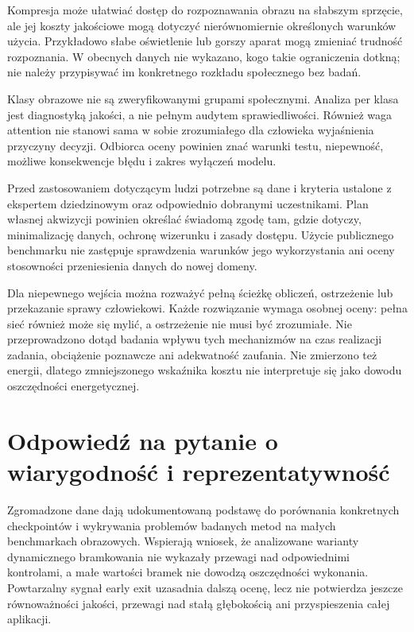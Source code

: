 \documentclass[12pt,a4paper]{article}
\begin{document}
Kompresja może ułatwiać dostęp do rozpoznawania obrazu na słabszym sprzęcie,
ale jej koszty jakościowe mogą dotyczyć nierównomiernie określonych warunków
użycia. Przykładowo słabe oświetlenie lub gorszy aparat mogą zmieniać
trudność rozpoznania. W obecnych danych nie wykazano, kogo takie ograniczenia
dotkną; nie należy przypisywać im konkretnego rozkładu społecznego bez badań.

Klasy obrazowe nie są zweryfikowanymi grupami społecznymi. Analiza per klasa
jest diagnostyką jakości, a nie pełnym audytem sprawiedliwości.
Również waga attention nie stanowi sama w sobie zrozumiałego dla człowieka
wyjaśnienia przyczyny decyzji. Odbiorca oceny powinien znać warunki testu,
niepewność, możliwe konsekwencje błędu i zakres wyłączeń modelu.

Przed zastosowaniem dotyczącym ludzi potrzebne są dane i kryteria ustalone
z ekspertem dziedzinowym oraz odpowiednio dobranymi uczestnikami.
Plan własnej akwizycji powinien określać świadomą zgodę tam, gdzie dotyczy,
minimalizację danych, ochronę wizerunku i zasady dostępu. Użycie publicznego
benchmarku nie zastępuje sprawdzenia warunków jego wykorzystania ani oceny
stosowności przeniesienia danych do nowej domeny.

Dla niepewnego wejścia można rozważyć pełną ścieżkę obliczeń, ostrzeżenie
lub przekazanie sprawy człowiekowi. Każde rozwiązanie wymaga osobnej
oceny: pełna sieć również może się mylić, a ostrzeżenie nie musi być
zrozumiałe. Nie przeprowadzono dotąd badania wpływu tych mechanizmów na
czas realizacji zadania, obciążenie poznawcze ani adekwatność zaufania.
Nie zmierzono też energii, dlatego zmniejszonego wskaźnika kosztu nie
interpretuje się jako dowodu oszczędności energetycznej.

\section{Odpowiedź na pytanie o wiarygodność i reprezentatywność}

Zgromadzone dane dają udokumentowaną podstawę do porównania konkretnych
checkpointów i wykrywania problemów badanych metod na małych benchmarkach
obrazowych. Wspierają wniosek, że analizowane warianty dynamicznego
bramkowania nie wykazały przewagi nad odpowiednimi kontrolami, a małe
wartości bramek nie dowodzą oszczędności wykonania. Powtarzalny sygnał
early exit uzasadnia dalszą ocenę, lecz nie potwierdza jeszcze równoważności
jakości, przewagi nad stałą głębokością ani przyspieszenia całej aplikacji.
\end{document}
